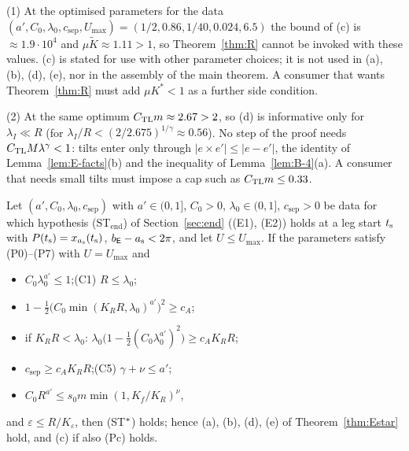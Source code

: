 \begin{remark}\label{rem:Estar-cd}
(1) At the optimised parameters for the data $(a',C_0,\lambda_0,c_{\mathrm{sep}},U_{\max})=(1/2,0.86,1/40,0.024,6.5)$ the bound of
(c) is $\approx1.9\cdot10^4$ and $\mu\tilde K\approx1.11>1$, so Theorem~\ref{thm:R} cannot be invoked with these values. (c) is
stated for use with other parameter choices; it is not used in (a), (b), (d), (e), nor in the assembly of the main theorem. A
consumer that wants Theorem~\ref{thm:R} must add $\mu K^*<1$ as a further side condition.

(2) At the same optimum $C_{\mathrm{TL}} m\approx2.67>2$, so (d) is informative only for $\lambda_I\ll R$ (for
$\lambda_I/R<(2/2.675)^{1/\gamma}\approx0.56$). No step of the proof needs $C_{\mathrm{TL}} M\lambda^\gamma<1$: tilts enter only through
$|e\times e'|\le|e-e'|$, the identity of Lemma~\ref{lem:E-facts}(b) and the inequality of Lemma~\ref{lem:B-4}(a). A consumer that
needs small tilts must impose a cap such as $C_{\mathrm{TL}} m\le0.33$.
\end{remark}

\begin{corollary}\label{cor:Estar}
Let $(a',C_0,\lambda_0,c_{\mathrm{sep}})$ with $a'\in(0,1]$, $C_0>0$, $\lambda_0\in(0,1]$, $c_{\mathrm{sep}}>0$ be data for
which hypothesis \textup{(ST$_{\mathrm{end}}$)} of Section~\ref{sec:end} (\textup{(E1)}, \textup{(E2)}) holds at a leg start $t_{\mathrm s}$
with $P(t_{\mathrm s})=x_{a_{\mathrm s}}(t_{\mathrm s})$, $b_{\mathsf E}-a_{\mathrm s}<2\pi$, and let $U\le U_{\max}$. If the parameters satisfy
\textup{(P0)}--\textup{(P7)} with $U=U_{\max}$ and
\begin{itemize}
\item[(C0)] $C_0\lambda_0^{a'}\le1$;\qquad (C1) $R\le\lambda_0$;
\item[(C2)] $1-\frac12\bigl(C_0\min(K_RR,\lambda_0)^{a'}\bigr)^2\ge c_A$;
\item[(C3)] if $K_RR<\lambda_0$: $\lambda_0\bigl(1-\frac12(C_0\lambda_0^{a'})^2\bigr)\ge c_AK_RR$;
\item[(C4)] $c_{\mathrm{sep}}\ge c_AK_RR$;\qquad (C5) $\gamma+\nu\le a'$;
\item[(C6)] $C_0R^{a'}\le s_0m\min(1,K_f/K_R)^\nu$,
\end{itemize}
and $\varepsilon\le R/K_\varepsilon$, then \textup{(ST$^{*}$)} holds; hence \textup{(a)}, \textup{(b)}, \textup{(d)}, \textup{(e)} of
Theorem~\ref{thm:Estar} hold, and \textup{(c)} if also \textup{(Pc)} holds.
\end{corollary}

